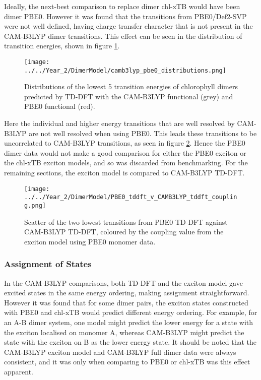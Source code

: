 Ideally, the next-best comparison to replace dimer chl-xTB would have been dimer
PBE0. However it was found that the transitions from PBE0/Def2-SVP were not well
defined, having charge transfer character that is not present in the CAM-B3LYP
dimer transitions. This effect can be seen in the distribution of transition energies, 
shown in figure \ref{fig:camb3lyp_pbe0_distributions}.

\begin{figure}
    \centering
    \texttt{[image: ../../Year\_2/DimerModel/camb3lyp\_pbe0\_distributions.png]}
    \label{fig:camb3lyp_pbe0_distributions}
    \caption{Distributions of the lowest 5 transition energies of chlorophyll dimers 
    predicted by TD-DFT with the CAM-B3LYP functional (grey) and PBE0 functional (red).}
\end{figure}

Here the individual \Qy and higher energy transitions that are well resolved by CAM-B3LYP
are not well resolved when using PBE0. This leads these transitions to be uncorrelated 
to CAM-B3LYP transitions, as seen in figure \ref{fig:pbe0_camb3lyp_coupling}. Hence
the PBE0 dimer data would not make a good comparison for either the PBE0 exciton 
or the chl-xTB exciton models, and so was discarded from benchmarking. For the remaining
sections, the exciton model is compared to CAM-B3LYP TD-DFT.

\begin{figure}
    \centering
    \texttt{[image: ../../Year\_2/DimerModel/PBE0\_tddft\_v\_CAMB3LYP\_tddft\_coupling.png]}
    \label{fig:pbe0_camb3lyp_coupling}
    \caption{Scatter of the two lowest transitions from PBE0 TD-DFT against CAM-B3LYP
    TD-DFT, coloured by the coupling value from the exciton model using PBE0 monomer 
    data.}
\end{figure}

\afterpartskip
\subsubsection{Assignment of States}
\label{subsec:state_assign}

In the CAM-B3LYP comparisons, both TD-DFT and the exciton model gave excited states
in the same energy ordering, making assignment straightforward. However it was found
that for some dimer pairs, the exciton states constructed with PBE0 and chl-xTB
would predict different energy ordering. For example, for an A-B  dimer system,
one model might predict the lower energy for a state with the exciton localised 
on monomer A, whereas CAM-B3LYP might predict the state with the exciton on B as
the lower energy state. It should be noted that the CAM-B3LYP exciton model and CAM-B3LYP 
full dimer data were always consistent, and it was only when comparing to PBE0 or
chl-xTB was this effect apparent.

